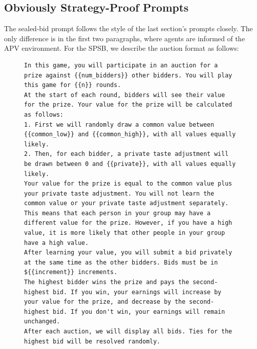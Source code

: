 \documentclass[acmsmall,screen,review]{acmart}
\begin{document}
\subsection{Obviously Strategy-Proof Prompts}\label{sec:osp-prompts}
The sealed-bid prompt follows the style of the last section's prompts closely. The only difference is in the first two paragraphs, where agents are informed of the APV environment. For the SPSB, we describe the auction format as follows:
\begin{figure}
\centering
\begin{minipage}{0.95\textwidth}
\begin{lstlisting}
In this game, you will participate in an auction for a prize against {{num_bidders}} other bidders. You will play this game for {{n}} rounds.
At the start of each round, bidders will see their value for the prize. Your value for the prize will be calculated as follows:
1. First we will randomly draw a common value between {{common_low}} and {{common_high}}, with all values equally likely.
2. Then, for each bidder, a private taste adjustment will be drawn between 0 and {{private}}, with all values equally likely.
Your value for the prize is equal to the common value plus your private taste adjustment. You will not learn the common value or your private taste adjustment separately. This means that each person in your group may have a different value for the prize. However, if you have a high value, it is more likely that other people in your group have a high value.
After learning your value, you will submit a bid privately at the same time as the other bidders. Bids must be in ${{increment}} increments.
The highest bidder wins the prize and pays the second-highest bid. If you win, your earnings will increase by your value for the prize, and decrease by the second-highest bid. If you don't win, your earnings will remain unchanged.
After each auction, we will display all bids. Ties for the highest bid will be resolved randomly.
\end{lstlisting}
\end{minipage}
\label{fig:sealbid_prompt-4}
\end{figure}
\end{document}
